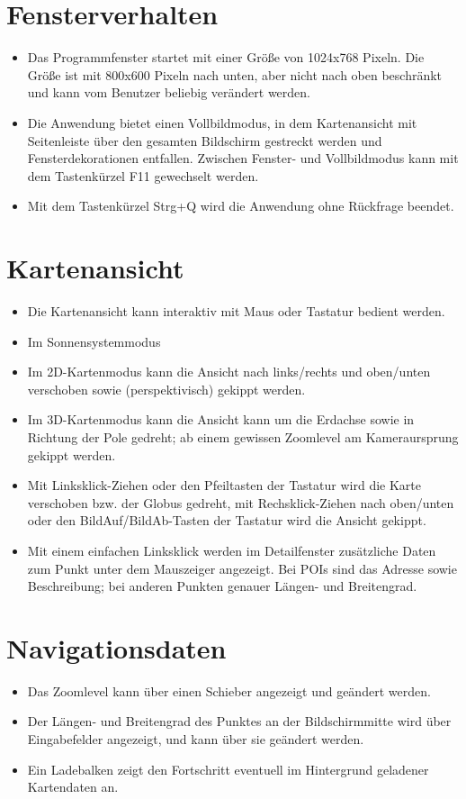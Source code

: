 \documentclass[10pt]{scrreprt}
\begin{document}
\section{Fensterverhalten}
\begin{itemize}
\item Das Programmfenster startet mit einer Größe von 1024x768 Pixeln. Die Größe ist mit 800x600 Pixeln nach unten, aber nicht nach oben beschränkt und kann vom Benutzer beliebig  verändert werden.
\item Die Anwendung bietet einen Vollbildmodus, in dem Kartenansicht mit Seitenleiste über den gesamten Bildschirm gestreckt werden und Fensterdekorationen entfallen. Zwischen Fenster- und Vollbildmodus kann mit dem Tastenkürzel F11 gewechselt werden.
\item Mit dem Tastenkürzel Strg+Q wird die Anwendung ohne Rückfrage beendet.
\end{itemize}
\section{Kartenansicht}
\begin{itemize}
\item Die Kartenansicht kann interaktiv mit Maus oder Tastatur bedient werden.
\item Im Sonnensystemmodus 
\item Im 2D-Kartenmodus kann die Ansicht nach links/rechts und oben/unten verschoben sowie (perspektivisch) gekippt werden. 
\item Im 3D-Kartenmodus kann die Ansicht kann um die Erdachse sowie in Richtung der Pole gedreht; ab einem gewissen Zoomlevel am Kameraursprung gekippt werden.
\item Mit Linksklick-Ziehen oder den Pfeiltasten der Tastatur wird die Karte verschoben bzw. der Globus gedreht, mit Rechsklick-Ziehen nach oben/unten oder den BildAuf/BildAb-Tasten der Tastatur wird die Ansicht gekippt.
\item Mit einem einfachen Linksklick werden im Detailfenster zusätzliche Daten zum Punkt unter dem Mauszeiger angezeigt. Bei POIs sind das Adresse sowie Beschreibung; bei anderen Punkten genauer Längen- und Breitengrad.
\end{itemize}
\section{Navigationsdaten}
\begin{itemize}
\item Das Zoomlevel kann über einen Schieber angezeigt und geändert werden.
\item Der Längen- und Breitengrad des Punktes an der Bildschirmmitte wird über Eingabefelder angezeigt, und kann über sie geändert werden.
\item Ein Ladebalken zeigt den Fortschritt eventuell im Hintergrund geladener Kartendaten an.
\end{itemize}
\end{document}
